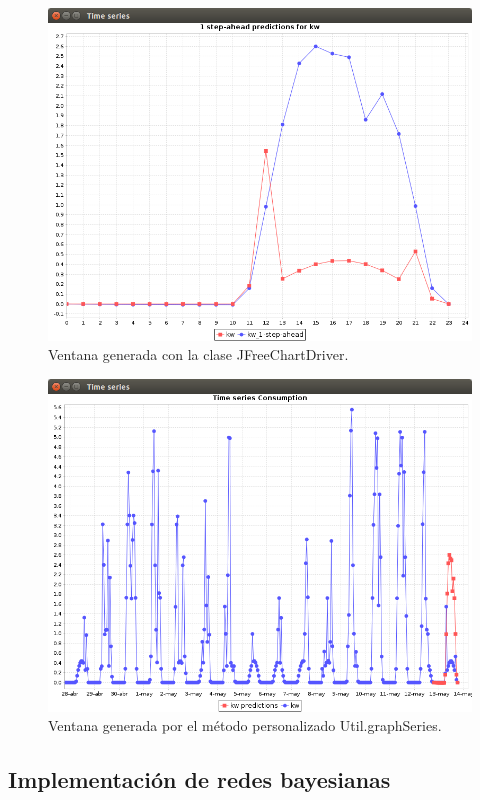 \begin{figure}[!b]
	\centering
	\includegraphics[width=13cm]{img/JFreeChartDriver.png}
	\caption{Ventana generada con la clase JFreeChartDriver. }
	\label{fig:JFreeChartDriver}
\end{figure}
\begin{figure}[!h]
	\centering
	\includegraphics[width=13cm]{img/UtilgraphSeries.png}
	\caption{Ventana generada por el método personalizado Util.graphSeries.}
	\label{fig:Util.graphSeries}
\end{figure}

\subsection{Implementación de redes bayesianas} \label{subsec:implementacionRedes}
